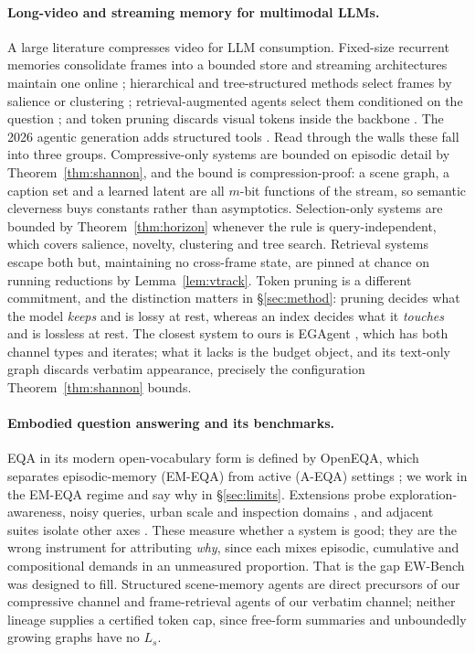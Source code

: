 \documentclass[10pt]{article}
\theoremstyle{definition}
\theoremstyle{plain}
\begin{document}
\paragraph{Long-video and streaming memory for multimodal LLMs.}
A large literature compresses video for LLM consumption. Fixed-size recurrent memories
consolidate frames into a bounded store \citep{moviechat,malmm} and streaming architectures
maintain one online \citep{flashvstream}; hierarchical and tree-structured methods select frames
by salience or clustering \citep{videotree,llovi}; retrieval-augmented agents select them
conditioned on the question \citep{videoagent,goldfish}; and token pruning discards visual
tokens inside the backbone \citep{fastv,prumerge,tosa}. The 2026 agentic generation adds
structured tools \citep{egagent,worldmm,vgent,videorag,streameqa}. Read through the walls these
fall into three groups. Compressive-only systems are bounded on episodic detail by
Theorem~\ref{thm:shannon}, and the bound is compression-proof: a scene graph, a caption set and
a learned latent are all $m$-bit functions of the stream, so semantic cleverness buys constants
rather than asymptotics. Selection-only systems are bounded by Theorem~\ref{thm:horizon}
whenever the rule is query-independent, which covers salience, novelty, clustering and tree
search. Retrieval systems escape both but, maintaining no cross-frame state, are pinned at
chance on running reductions by Lemma~\ref{lem:vtrack}. Token pruning is a different commitment,
and the distinction matters in \S\ref{sec:method}: pruning decides what the model \emph{keeps}
and is lossy at rest, whereas an index decides what it \emph{touches} and is lossless at rest.
The closest system to ours is EGAgent \citep{egagent}, which has both channel types and
iterates; what it lacks is the budget object, and its text-only graph discards verbatim
appearance, precisely the configuration Theorem~\ref{thm:shannon} bounds.

\paragraph{Embodied question answering and its benchmarks.}
EQA \citep{eqa-das} in its modern open-vocabulary form is defined by OpenEQA, which separates
episodic-memory (EM-EQA) from active (A-EQA) settings \citep{openeqa}; we work in the EM-EQA
regime and say why in \S\ref{sec:limits}. Extensions probe exploration-awareness, noisy queries,
urban scale and inspection domains \citep{expressbench,noisyeqa,cityeqa,bridgeeqa}, and adjacent
suites isolate other axes \citep{vsibench,egoschema,videomme,erqa,embodiedbench}. These measure
whether a system is good; they are the wrong instrument for attributing \emph{why}, since each
mixes episodic, cumulative and compositional demands in an unmeasured proportion. That is the
gap EW-Bench was designed to fill. Structured scene-memory agents
\citep{graphpad,sayplan,conceptgraphs} are direct precursors of our compressive channel and
frame-retrieval agents \citep{videoagent} of our verbatim channel; neither lineage supplies a
certified token cap, since free-form summaries and unboundedly growing graphs have no $L_s$.
\end{document}
